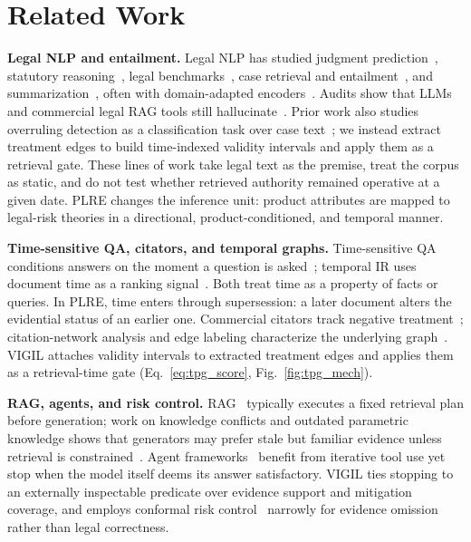 \section{Related Work}
\label{sec:related_work}

\textbf{Legal NLP and entailment.} Legal NLP has studied judgment prediction~\citep{chalkidis2019neural}, statutory reasoning~\citep{holzenberger2020sara}, legal benchmarks~\citep{chalkidis2022lexglue,guha2023legalbench}, case retrieval and entailment~\citep{rabelo2022coliee}, and summarization~\citep{huang2021efficient,manor2019plain}, often with domain-adapted encoders~\citep{chalkidis2020legalbert,zheng2021legalbert,xiao2021lawformer}. Audits show that LLMs and commercial legal RAG tools still hallucinate~\citep{dahl2024hallucinating,magesh2024hallucination}. Prior work also studies overruling detection as a classification task over case text~\citep{zheng2021legalbert,guha2023legalbench}; we instead extract treatment edges to build time-indexed validity intervals and apply them as a retrieval gate. These lines of work take legal text as the premise, treat the corpus as static, and do not test whether retrieved authority remained operative at a given date. PLRE changes the inference unit: product attributes are mapped to legal-risk theories in a directional, product-conditioned, and temporal manner.

\textbf{Time-sensitive QA, citators, and temporal graphs.} Time-sensitive QA conditions answers on the moment a question is asked~\citep{zhang2021situatedqa,chen2021timeqa,liska2022streamingqa,kasai2023realtimeqa,dhingra2022timeaware}; temporal IR uses document time as a ranking signal~\citep{campos2014temporal}. Both treat time as a property of facts or queries. In PLRE, time enters through supersession: a later document alters the evidential status of an earlier one. Commercial citators track negative treatment~\citep{shepards2024,keycite2024}; citation-network analysis and edge labeling characterize the underlying graph~\citep{fowler2007network,sadeghian2018semantic}. VIGIL attaches validity intervals to extracted treatment edges and applies them as a retrieval-time gate (Eq.~\eqref{eq:tpg_score}, Fig.~\ref{fig:tpg_mech}).

\textbf{RAG, agents, and risk control.} RAG~\citep{lewis2020retrieval,karpukhin2020dense,gao2023retrieval} typically executes a fixed retrieval plan before generation; work on knowledge conflicts and outdated parametric knowledge shows that generators may prefer stale but familiar evidence unless retrieval is constrained~\citep{longpre2021entity,chen2022rich,xie2024adaptive}. Agent frameworks~\citep{yao2022react,shinn2023reflexion,wei2022chain,langgraph2024,autogpt2023,park2023generative,wang2024voyager,wang2024multiagent} benefit from iterative tool use yet stop when the model itself deems its answer satisfactory. VIGIL ties stopping to an externally inspectable predicate over evidence support and mitigation coverage, and employs conformal risk control~\citep{angelopoulos2023conformalrisk,angelopoulos2021ltt,geifman2017selective} narrowly for evidence omission rather than legal correctness.
